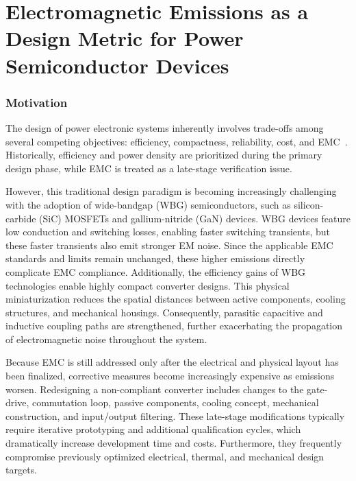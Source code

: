 \chapter{Electromagnetic Emissions as a Design Metric for Power Semiconductor Devices}
\label{ch:Introduction}


\subsection*{Motivation}


The design of power electronic systems inherently involves trade-offs among several competing objectives: efficiency, compactness, reliability, cost, and EMC~\cite{ieee_industry_applications_society_ieee_2024,rosado_design_2006}. 
Historically, efficiency and power density are prioritized during the primary design phase, while EMC is treated as a late-stage verification issue.

However, this traditional design paradigm is becoming increasingly challenging with the adoption of wide-bandgap (WBG) semiconductors, such as silicon-carbide (SiC) MOSFETs and gallium-nitride (GaN) devices. 
WBG devices feature low conduction and switching losses, enabling faster switching transients, but these faster transients also emit stronger EM noise. 
Since the applicable EMC standards and limits remain unchanged, these higher emissions directly complicate EMC compliance.
Additionally, the efficiency gains of WBG technologies enable highly compact converter designs. This physical miniaturization reduces the spatial distances between active components, cooling structures, and mechanical housings. 
Consequently, parasitic capacitive and inductive coupling paths are strengthened, further exacerbating the propagation of electromagnetic noise throughout the system.

Because EMC is still addressed only after the electrical and physical layout has been finalized, corrective measures become increasingly expensive as emissions worsen. 
Redesigning a non-compliant converter includes changes to the gate-drive, commutation loop, passive components, cooling concept, mechanical construction, and input/output filtering. 
These late-stage modifications typically require iterative prototyping and additional qualification cycles, which dramatically increase development time and costs. 
Furthermore, they frequently compromise previously optimized electrical, thermal, and mechanical design targets.

